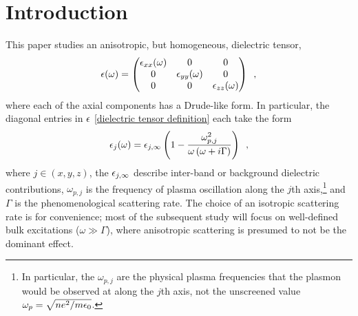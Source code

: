 \section*{Introduction}

This paper studies an anisotropic, but homogeneous, dielectric tensor,
\begin{equation}
    \label{dielectric tensor definition}
    \epsilon(\omega) = \begin{pmatrix}
    \epsilon_{xx}(\omega) & 0 & 0
    \\ 0 & \epsilon_{yy}(\omega) & 0
    \\ 0 & 0 & \epsilon_{zz}(\omega)
    \end{pmatrix}
    \,\,\,,
\end{equation}
where each of the axial components has a Drude-like form.  In particular, the diagonal entries in $\epsilon$ \eqref{dielectric tensor definition} each take the form
\begin{equation}
    \label{dielectric component Drude definition}
    \epsilon_j(\omega) = \epsilon_{j,\infty}\left( 1-\frac{\omega_{p,j}^2}{\omega\left(\omega+i\Gamma\right)}\right)\,\,\,,
\end{equation}
where $j\in(x,y,z)$, the $\epsilon_{j,\infty}$ describe inter-band or background dielectric contributions, $\omega_{p,j}$ is the frequency of plasma oscillation along the $j$th axis,\footnote{In particular, the $\omega_{p,j}$ are the physical plasma frequencies that the plasmon would be observed at along the $j$th axis, not the unscreened value $\omega_p=\sqrt{ne^2/m\epsilon_0}$.} and $\Gamma$ is the phenomenological scattering rate.  The choice of an isotropic scattering rate is for convenience; most of the subsequent study will focus on well-defined bulk excitations ($\omega\gg\Gamma$), where anisotropic scattering is presumed to not be the dominant effect.